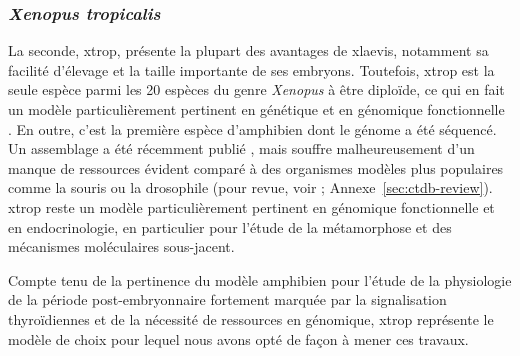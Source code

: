 \documentclass[../main.tex]{subfiles}
\begin{document}
		\subsubsection{\textit{Xenopus tropicalis}}
			La seconde, \gls{xtrop}, présente la plupart des avantages de \gls{xlaevis}, notamment sa facilité d'élevage et la taille importante de ses embryons.
			Toutefois, \gls{xtrop} est la seule espèce parmi les 20 espèces du genre \textit{Xenopus} à être diploïde, ce qui en fait un modèle particulièrement pertinent en génétique et en génomique fonctionnelle \citep{Amaya2005}.
			En outre, c'est la première espèce d'amphibien dont le génome a été séquencé.
			Un assemblage a été récemment publié \citep{Hellsten2010a}, mais souffre malheureusement d'un manque de ressources évident comparé à des organismes modèles plus populaires comme la souris ou la drosophile (pour revue, voir \citet{Grimaldi2013}; Annexe~\ref{sec:ctdb-review}).
			\gls{xtrop} reste un modèle particulièrement pertinent en génomique fonctionnelle et en endocrinologie, en particulier pour l'étude de la métamorphose et des mécanismes moléculaires sous-jacent.
			\par
			Compte tenu de la pertinence du modèle amphibien pour l'étude de la physiologie de la période post-embryonnaire fortement marquée par la signalisation thyroïdiennes et de la nécessité de ressources en génomique, \gls{xtrop} représente le modèle de choix pour lequel nous avons opté de façon à mener ces travaux.

\end{document}
